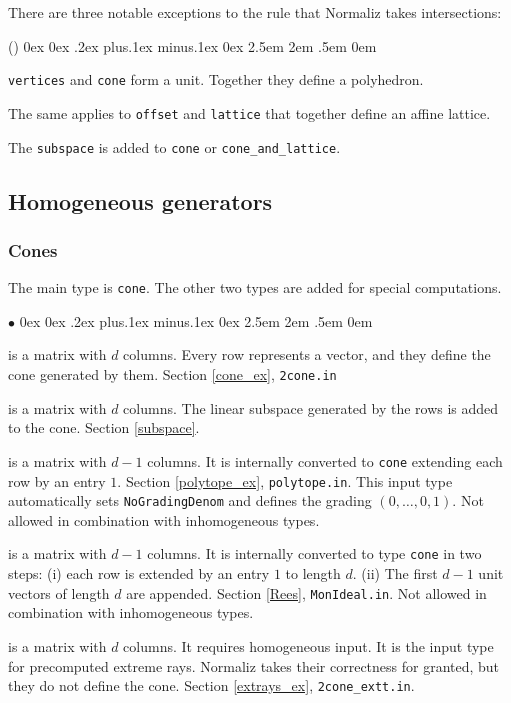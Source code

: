 \documentclass[12pt,a4paper]{scrartcl}
\newcounter{listi}
\newcommand{\stdli}{ \topsep0ex \partopsep0ex %
\parsep.2ex plus.1ex minus.1ex \itemsep0ex%
\leftmargin2.5em \labelwidth2em \labelsep.5em \rightmargin0em}%
\newenvironment{arab}{\begin{list}{\textup{(\arabic{listi})}}%
	{\usecounter{listi}\stdli}}{\end{list}}
\renewenvironment{itemize}{\begin{list}{{$\bullet$}}{\stdli}}{\end{list}}
\theoremstyle{definition}
\def\itemtt[#1]{\item[\textbf{\ttt{#1}}]}
\def\ttt{\texttt}
\begin{document}
There are three notable exceptions to the rule that Normaliz takes intersections:
\begin{arab}
	\item \verb|vertices| and \verb|cone| form a unit. Together they define a polyhedron.
	\item The same applies to \verb|offset| and \verb|lattice| that together define an affine lattice.
	\item The \verb|subspace| is added to \verb|cone| or \verb|cone_and_lattice|.
\end{arab}

\subsection{Homogeneous generators}

\subsubsection{Cones}\label{cone_synt}

The main type is \verb|cone|. The other two types are added for special computations.

\begin{itemize}
	\itemtt[cone] is a matrix with $d$ columns. Every row represents a vector, and they define the cone generated by them. Section \ref{cone_ex}, \verb|2cone.in|

	\itemtt[subspace] is a matrix with $d$ columns. The linear subspace generated by the rows is added to the cone. Section \ref{subspace}.
	
	\itemtt[polytope] is a matrix with $d-1$ columns. It is internally converted to \verb|cone| extending each row by an entry $1$.  Section \ref{polytope_ex}, \verb|polytope.in|. This input type automatically sets \verb|NoGradingDenom| and defines the grading $(0,\dots,0,1)$. Not allowed in combination with inhomogeneous types.
	
	\itemtt[rees\_algebra] is a matrix with $d-1$ columns. It is internally converted to type \verb|cone| in two steps: (i) each row is extended by an entry $1$ to length $d$. (ii) The first $d-1$ unit vectors of length $d$ are appended. Section \ref{Rees}, \verb|MonIdeal.in|. Not allowed in combination with inhomogeneous types.
	
	\itemtt[extreme\_rays] is a matrix with $d$ columns. It requires homogeneous input. It is the input type for precomputed extreme rays. Normaliz takes their correctness for granted, but they do not define the cone. Section \ref{extrays_ex}, \verb|2cone_extt.in|.
\end{itemize}
\end{document}
